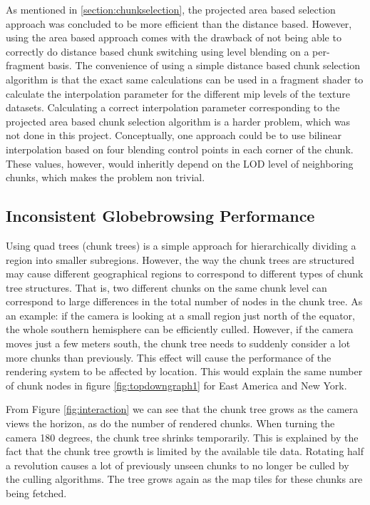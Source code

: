 As mentioned in \ref{section:chunkselection}, the projected area based selection approach was concluded to be more efficient than the distance based. However, using the area based approach comes with the drawback of not being able to correctly do distance based chunk switching using level blending on a per-fragment basis. The convenience of using a simple distance based chunk selection algorithm is that the exact same calculations can be used in a fragment shader to calculate the interpolation parameter for the different mip levels of the texture datasets. Calculating a correct interpolation parameter corresponding to the projected area based chunk selection algorithm is a harder problem, which was not done in this project. Conceptually, one approach could be to use bilinear interpolation based on four blending control points in each corner of the chunk. These values, however, would inheritly depend on the LOD level of neighboring chunks, which makes the problem non trivial. 



\subsection{Inconsistent Globebrowsing Performance}
Using quad trees (chunk trees) is a simple approach for hierarchically dividing a region into smaller subregions. 
However, the way the chunk trees are structured may cause different geographical regions to correspond to different types of chunk tree structures. 
That is, two different chunks on the same chunk level can correspond to large differences in the total number of nodes in the chunk tree. 
As an example: if the camera is looking at a small region just north of the equator, the whole southern hemisphere can be efficiently culled. 
However, if the camera moves just a few meters south, the chunk tree needs to suddenly consider a lot more chunks than previously. 
This effect will cause the performance of the rendering system to be affected by location. 
This would explain the same number of chunk nodes in figure \ref{fig:topdowngraph1} for East America and New York. 

From Figure \ref{fig:interaction} we can see that the chunk tree grows as the camera views the horizon, as do the number of rendered chunks. When turning the camera 180 degrees, the chunk tree shrinks temporarily. This is explained by the fact that the chunk tree growth is limited by the available tile data. Rotating half a revolution causes a lot of previously unseen chunks to no longer be culled by the culling algorithms. The tree grows again as the map tiles for these chunks are being fetched. 




